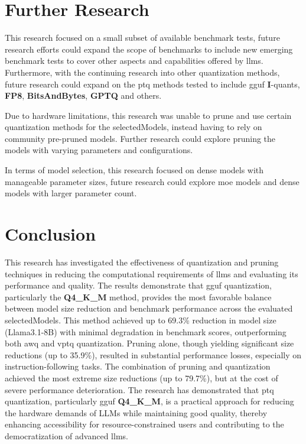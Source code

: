 \documentclass{ifacconf}
\begin{document}
	\section{Further Research}
	This research focused on a small subset of available benchmark tests, future research efforts could expand the scope of benchmarks to include new emerging benchmark tests to cover other aspects and capabilities offered by \glspl{llm}. Furthermore, with the continuing research into other quantization methods, future research could expand on the \gls{ptq} methods tested to include \gls{gguf} \textbf{I}-quants, \textbf{FP8}, \textbf{BitsAndBytes}, \textbf{GPTQ} and others.
	
	Due to hardware limitations, this research was unable to prune and use certain quantization methods for the \gls{selectedModels}, instead having to rely on community pre-pruned models. Further research could explore pruning the models with varying parameters and configurations.
	
	In terms of model selection, this research focused on dense models with manageable parameter sizes, future research could explore \gls{moe} models and dense models with larger parameter count.
	
	\section{Conclusion}
	This research has investigated the effectiveness of quantization and pruning techniques in reducing the computational requirements of \glspl{llm} and evaluating its performance and quality. The results demonstrate that \gls{gguf} quantization, particularly the \textbf{Q4\_K\_M} method, provides the most favorable balance between model size reduction and benchmark performance across the evaluated \gls{selectedModels}. This method achieved up to 69.3\% reduction in model size (Llama3.1-8B) with minimal degradation in benchmark scores, outperforming both \gls{awq} and \gls{vptq} quantization. Pruning alone, though yielding significant size reductions (up to 35.9\%), resulted in substantial performance losses, especially on instruction-following tasks. The combination of pruning and quantization achieved the most extreme size reductions (up to 79.7\%), but at the cost of severe performance deterioration. The research has demonstrated that \gls{ptq} quantization, particularly \gls{gguf} \textbf{Q4\_K\_M}, is a practical approach for reducing the hardware demands of LLMs while maintaining good quality, thereby enhancing accessibility for resource-constrained users and contributing to the democratization of advanced \glspl{llm}.
	
\end{document}
